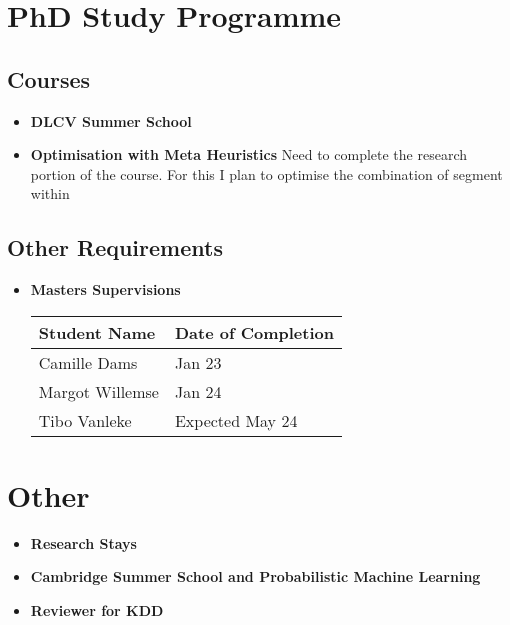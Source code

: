 \section{PhD Study Programme}

\subsection{Courses}

\begin{itemize}
    \item \textbf{DLCV Summer School}
    \item \textbf{Optimisation with Meta Heuristics}
    Need to complete the research portion of the course.
    For this I plan to optimise the combination of segment within 
\end{itemize}

\subsection{Other Requirements}

\begin{itemize}
    \item \textbf{Masters Supervisions}
    \begin{table}[h]
    \begin{tabular}{|l|l|}
        \hline
        \textbf{Student Name} & \textbf{Date of Completion} \\ \hline
        Camille Dams & Jan 23 \\ \hline
        Margot Willemse & Jan 24 \\ \hline
        Tibo Vanleke & Expected May 24\\ \hline
    \end{tabular}
\end{table}
\end{itemize}

\section{Other}

\begin{itemize}
    \item \textbf{Research Stays}
    \item \textbf{Cambridge Summer School and Probabilistic Machine Learning}
    \item \textbf{Reviewer for KDD}
\end{itemize}


